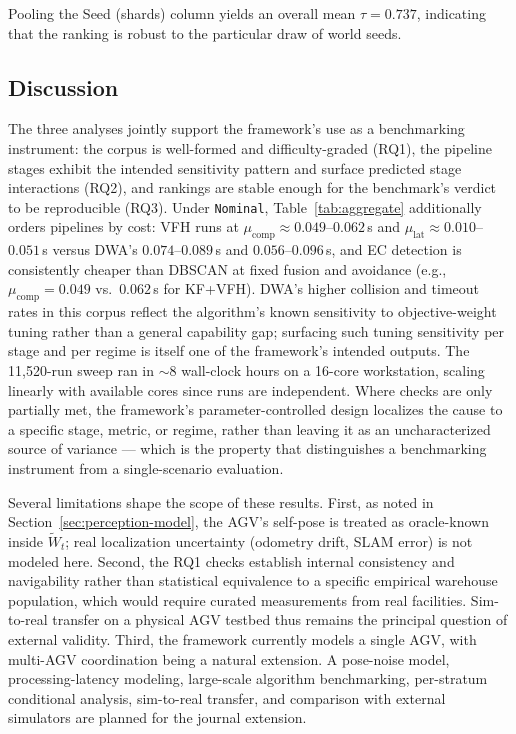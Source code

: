 \documentclass[conference]{IEEEtran}
\begin{document}
Pooling the Seed (shards) column yields an overall mean $\tau = 0.737$, indicating that the ranking is robust to the particular draw of world seeds.
 
 
\subsection{Discussion}
\label{sec:discussion}
The three analyses jointly support the framework's use as a benchmarking instrument: the corpus is well-formed and difficulty-graded (RQ1), the pipeline stages exhibit the intended sensitivity pattern and surface predicted stage interactions (RQ2), and rankings are stable enough for the benchmark's verdict to be reproducible (RQ3). Under \texttt{Nominal}, Table~\ref{tab:aggregate} additionally orders pipelines by cost: VFH runs at $\mu_{\text{comp}}\!\approx\!0.049$--$0.062$\,s and $\mu_{\text{lat}}\!\approx\!0.010$--$0.051$\,s versus DWA's $0.074$--$0.089$\,s and $0.056$--$0.096$\,s, and EC detection is consistently cheaper than DBSCAN at fixed fusion and avoidance (e.g., $\mu_{\text{comp}}=0.049$ vs.\ $0.062$\,s for KF+VFH). DWA's higher collision and timeout rates in this corpus reflect the algorithm's known sensitivity to objective-weight tuning rather than a general capability gap; surfacing such tuning sensitivity per stage and per regime is itself one of the framework's intended outputs. The 11{,}520-run sweep ran in $\sim$8 wall-clock hours on a 16-core workstation, scaling linearly with available cores since runs are independent. Where checks are only partially met, the framework's parameter-controlled design localizes the cause to a specific stage, metric, or regime, rather than leaving it as an uncharacterized source of variance --- which is the property that distinguishes a benchmarking instrument from a single-scenario evaluation.
 
Several limitations shape the scope of these results. First, as noted in Section~\ref{sec:perception-model}, the AGV's self-pose is treated as oracle-known inside $\tilde{W}_t$; real localization uncertainty (odometry drift, SLAM error) is not modeled here. Second, the RQ1 checks establish internal consistency and navigability rather than statistical equivalence to a specific empirical warehouse population, which would require curated measurements from real facilities. Sim-to-real transfer on a physical AGV testbed thus remains the principal question of external validity. Third, the framework currently models a single AGV, with multi-AGV coordination being a natural extension.
A pose-noise model, processing-latency modeling, large-scale algorithm benchmarking, per-stratum conditional analysis, sim-to-real transfer, and comparison with external simulators are planned for the journal extension.
 
\end{document}

